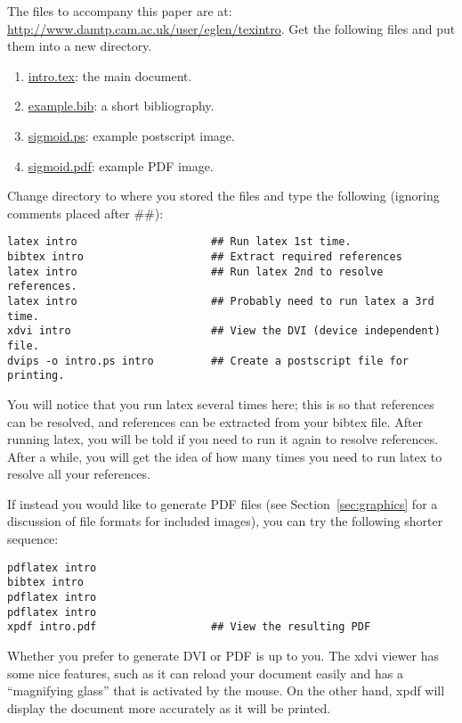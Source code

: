\documentclass[12pt]{article}
\begin{document}
The files to accompany this paper are at:
\url{http://www.damtp.cam.ac.uk/user/eglen/texintro}.  Get the
following files and put them into a new directory.

\begin{enumerate}
  \item \url{intro.tex}: the main \latex document.
  \item \url{example.bib}: a short bibliography.
  \item \url{sigmoid.ps}: example postscript image.
  \item \url{sigmoid.pdf}: example PDF image.
\end{enumerate}

Change directory to where you stored the files and type the
following (ignoring comments placed after \#\#):

\begin{verbatim}
latex intro                     ## Run latex 1st time.
bibtex intro                    ## Extract required references
latex intro                     ## Run latex 2nd to resolve references.
latex intro                     ## Probably need to run latex a 3rd time.
xdvi intro                      ## View the DVI (device independent) file.
dvips -o intro.ps intro         ## Create a postscript file for printing.
\end{verbatim}

You will notice that you run latex several times here; this is so that
references can be resolved, and references can be extracted from your
bibtex file.  After running latex, you will be told if you need to run
it again to resolve references.  After a while, you will get the idea
of how many times you need to run latex to resolve all your
references.

If instead you would like to generate PDF files (see
Section~\ref{sec:graphics} for a discussion of file formats for
included images), you can try the following shorter sequence:

\begin{verbatim}
pdflatex intro
bibtex intro
pdflatex intro
pdflatex intro
xpdf intro.pdf                  ## View the resulting PDF
\end{verbatim}

Whether you prefer to generate DVI or PDF is up to you.  The xdvi
viewer has some nice features, such as it can reload your document
easily and has a ``magnifying glass'' that is activated by the mouse.
On the other hand, xpdf will display the document more accurately as 
it will be printed.
\end{document}
